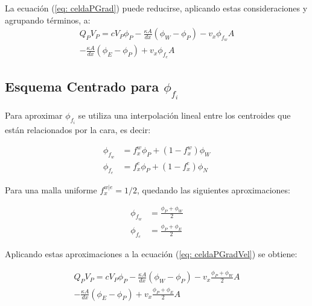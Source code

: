 \documentclass{article}
\begin{document}
    La ecuación (\ref{eq: celdaPGrad}) puede reducirse, aplicando estas consideraciones y agrupando términos, a:
    \begin{multline}
    	    Q_P V_P = c  V_P \phi_P - \frac{\kappa A}{dx} \left( \phi_W - \phi_P \right) - v_x \phi_{f_w} A \\
    	        - \frac{\kappa A}{dx} \left( \phi_E - \phi_P \right) + v_x \phi_{f_e} A
            \label{eq: celdaPGradVel}
    \end{multline}
    
        \subsection{Esquema Centrado para $\phi_{f_i}$}

        Para aproximar $\phi_{f_i}$ se utiliza una interpolación lineal entre los centroides que están relacionados por la cara, es decir:

        \begin{equation*}
            \begin{aligned}
                \phi_{f_w} &= f_x^w \phi_P + (1 - f_x^w) \phi_W \\
                \phi_{f_e} &= f_x^e \phi_P + (1 - f_x^e) \phi_N
            \end{aligned}
        \end{equation*}

        Para una malla uniforme $f_x^{w|e} = 1/2$, quedando las siguientes aproximaciones:

        \begin{equation*}
            \begin{aligned}
                \phi_{f_w} &= \frac{\phi_P +  \phi_W}{2} \\
                \phi_{f_e} &= \frac{\phi_P +  \phi_E}{2}
			\end{aligned}
        \end{equation*}

        Aplicando estas aproximaciones a la ecuación (\ref{eq: celdaPGradVel}) se obtiene:

        \begin{multline}
    	    Q_P V_P = c  V_P \phi_P - \frac{\kappa A}{dx} \left( \phi_W - \phi_P \right) - v_x \frac{\phi_P +  \phi_W}{2} A \\ 
    	        - \frac{\kappa A}{dx} \left( \phi_E - \phi_P \right) + v_x \frac{\phi_P +  \phi_E}{2} A
    	        \label{eq: celdaPCentrado}
        \end{multline}
            
\end{document}
